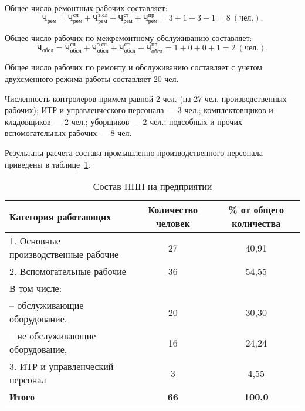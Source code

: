 \vspace{-3mm}
Общее число ремонтных рабочих составляет:
\begin{equation*}
  \text{Ч}_{\text{рем}} = 
  \text{Ч}^{\text{сл}}_{\text{рем}} + \text{Ч}^{\text{э.сл}}_{\text{рем}} +
  \text{Ч}^{\text{ст}}_{\text{рем}} + \text{Ч}^{\text{пр}}_{\text{рем}} =
  3 + 1 + 3 + 1 = 8 \: (\text{чел.}).
\end{equation*}

Общее число рабочих по межремонтному обслуживанию составляет:
\begin{equation*}
  \text{Ч}_{\text{обсл}} = 
  \text{Ч}^{\text{сл}}_{\text{обсл}} + \text{Ч}^{\text{э.сл}}_{\text{обсл}} +
  \text{Ч}^{\text{ст}}_{\text{обсл}} + \text{Ч}^{\text{пр}}_{\text{обсл}} =
  1 + 0 + 0 + 1 = 2 \: (\text{чел.}).
\end{equation*}

Общее число рабочих по ремонту и обслуживанию составляет с учетом
двухсменного режима работы составляет 20 чел.

Численность контролеров примем равной 2 чел. 
(на 27 чел. производственных рабочих);
ИТР и управленческого персонала --- 3 чел.;
комплектовщиков и кладовщиков --- 2 чел.;
уборщиков --- 2 чел.;
подсобных и прочих вспомогательных рабочих --- 8 чел.

Результаты расчета состава промышленно-производственного персонала
приведены в таблице~\ref{tbl:number}.

\begin{table} [h!]
  \caption{
    Состав ППП на предприятии
  }\label{tbl:number}
    \begin{tabular}{| m{9cm} | c | c |}
      \hline
        \parbox{9cm}{
          \smallskip
          \centering Категория работающих
          \smallskip
        }
      & \parbox{2.8cm}{
          \smallskip
          \centering Количество человек
          \smallskip
        }
      & \parbox{3.3cm}{
          \smallskip
          \centering \% от общего количества
          \smallskip
        } \\
      \hline

      1. Основные производственные рабочие & 27 & 40{,}91 \\
      \hline

      2. Вспомогательные рабочие & 36 & 54{,}55 \\

      В том числе: & & \\
      -- обслуживающие оборудование, & 20 & 30{,}30 \\
      -- не обслуживающие оборудование, & 16 & 24{,}24 \\
      \hline

      3. ИТР и управленческий персонал & 3 & 4{,}55 \\
      \hline

      \raggedleft \textbf{Итого} & \textbf{66} & \textbf{100{,}0} \\
      \hline
    \end{tabular}
\end{table}